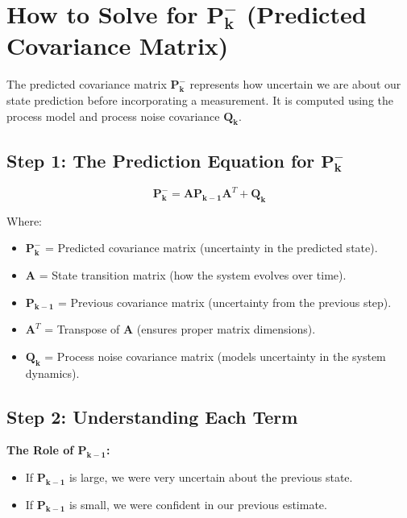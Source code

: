 \documentclass{article}
\begin{document}
\newpage



\section{How to Solve for \(\mathbf{P_k^-}\) (Predicted Covariance Matrix)}

The predicted covariance matrix \(\mathbf{P_k^-}\) represents how uncertain we are about our state prediction before incorporating a measurement. It is computed using the process model and process noise covariance \(\mathbf{Q_k}\).

\subsection*{Step 1: The Prediction Equation for \(\mathbf{P_k^-}\)}
\[
\mathbf{P_k^-} = \mathbf{A} \mathbf{P_{k-1}} \mathbf{A}^T + \mathbf{Q_k}
\]

Where:
\begin{itemize}
    \item \(\mathbf{P_k^-}\) = Predicted covariance matrix (uncertainty in the predicted state).
    \item \(\mathbf{A}\) = State transition matrix (how the system evolves over time).
    \item \(\mathbf{P_{k-1}}\) = Previous covariance matrix (uncertainty from the previous step).
    \item \(\mathbf{A}^T\) = Transpose of \(\mathbf{A}\) (ensures proper matrix dimensions).
    \item \(\mathbf{Q_k}\) = Process noise covariance matrix (models uncertainty in the system dynamics).
\end{itemize}

\subsection*{Step 2: Understanding Each Term}
\textbf{The Role of \(\mathbf{P_{k-1}}\):}
\begin{itemize}
    \item If \(\mathbf{P_{k-1}}\) is large, we were very uncertain about the previous state.
    \item If \(\mathbf{P_{k-1}}\) is small, we were confident in our previous estimate.
\end{itemize}
\end{document}
